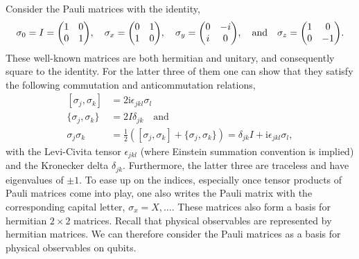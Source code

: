 Consider the Pauli matrices with the identity,
\begin{align}
  \sigma_0 = I = \mqty(\pmat{0}),\quad \sigma_x = \mqty(\pmat{1}), \quad \sigma_y =
  \mqty(\pmat{2}), \quad \text{and}\quad \sigma_z = \mqty(\pmat{3})
.\end{align}
These well-known matrices are both hermitian and unitary, and consequently
square to the identity. For the latter three of them one can show that they
satisfy the following commutation and anticommutation relations,
\begin{equation}\label{eq:pauli-comm}
 \begin{split}
  [\sigma_j, \sigma_k] &= 2\mathrm{i}\epsilon_{jkl}\sigma_l \\
  \{\sigma_j, \sigma_k\} &= 2I \delta_{jk}\quad \text{and} \\
  \sigma_j \sigma_k &= \frac{1}{2}\left([\sigma_j,\sigma_k] +
  \{\sigma_j,\sigma_k\}  \right) = \delta_{jk} I + \mathrm{i} \epsilon_{jkl}
  \sigma_l
,\end{split} 
\end{equation}
with the Levi-Civita tensor $\epsilon_{jkl}$ (where Einstein summation
convention is implied) and the Kronecker delta $\delta_{jk}$. Furthermore, the latter
three are traceless and have eigenvalues of $\pm 1$.
To ease up on the
indices, especially once tensor products of Pauli matrices come into play, one also writes the Pauli matrix with the corresponding capital
letter, $\sigma_x = X, \ldots$. These matrices also form a basis for hermitian
$2\times 2$ matrices. Recall that physical observables are represented by
hermitian matrices. We can therefore consider the Pauli matrices as a basis for
physical observables on qubits. 

